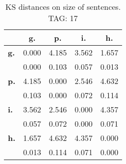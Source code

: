 \begin{table}[h!]
\begin{center}
\begin{tabular}{| l || c | c | c | c |}\hline
 & {\bf g.} & {\bf p.} & {\bf i.} & {\bf h.} \\\hline\hline
{\bf g.} & 0.000 & 4.185 & 3.562 & 1.657 \\
{\bf } & 0.000 & 0.103 & 0.057 & 0.013 \\\hline
{\bf p.} & 4.185 & 0.000 & 2.546 & 4.632 \\
{\bf } & 0.103 & 0.000 & 0.072 & 0.114 \\\hline
{\bf i.} & 3.562 & 2.546 & 0.000 & 4.357 \\
{\bf } & 0.057 & 0.072 & 0.000 & 0.071 \\\hline
{\bf h.} & 1.657 & 4.632 & 4.357 & 0.000 \\
{\bf } & 0.013 & 0.114 & 0.071 & 0.000 \\\hline
\end{tabular}
\caption{KS distances on size of sentences. TAG: 17}
\end{center}
\end{table}